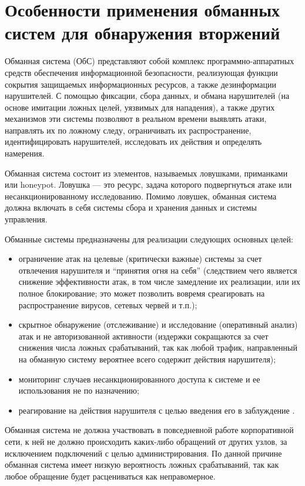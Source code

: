 \section{Особенности применения обманных систем для обнаружения вторжений}

Обманная система (ОбС) представляют собой комплекс программно-аппаратных средств обеспечения информационной безопасности, реализующая функции сокрытия защищаемых информационных ресурсов, а также дезинформации нарушителей. С помощью фиксации, сбора данных, и обмана нарушителей (на основе имитации ложных целей, уязвимых для нападения), а также других механизмов эти системы позволяют в реальном времени выявлять атаки, направлять их по ложному следу, ограничивать их распространение, идентифицировать нарушителей, исследовать их действия и определять намерения\citep{Kotenko2014}.

Обманная система состоит из элементов, называемых ловушками, приманками или honeypot. Ловушка — это ресурс, задача которого подвергнуться атаке или несанкционированному исследованию. Помимо ловушек, обманная система должна включать в себя системы сбора и хранения данных и системы управления. 

Обманные системы предназначены для реализации следующих основных целей:
\begin{itemize}
\item ограничение атак на целевые (критически важные) системы за счет отвлечения нарушителя и “принятия огня на себя” (следствием чего является снижение эффективности атак, в том числе замедление их реализации, или их полное блокирование; это может позволить вовремя среагировать на распространение вирусов, сетевых червей и т.п.);
\item скрытное обнаружение (отслеживание) и исследование (оперативный анализ) атак и не авторизованной активности (издержки сокращаются за счет снижения числа ложных срабатываний, так как любой трафик, направленный на обманную систему вероятнее всего содержит действия нарушителя); 
\item мониторинг случаев несанкционированного доступа к системе и ее использования не по назначению;
\item реагирование на действия нарушителя с целью введения его в заблуждение \citep{Kotenko2014} \citep{Hernacki2004}.
\end{itemize}

Обманная система не должна участвовать в повседневной работе корпоративной сети, к ней не должно происходить каких-либо обращений от других узлов, за исключением подключений с целью администрирования. По данной причине обманная система имеет низкую вероятность ложных срабатываний, так как любое обращение будет расцениваться как неправомерное.

